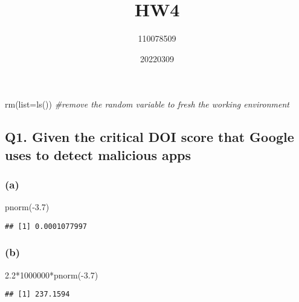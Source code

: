 \documentclass[
]{article}
\title{HW4}
\author{110078509}
\date{20220309}
\newenvironment{Shaded}{\begin{snugshade}}{\end{snugshade}}
\newcommand{\AttributeTok}[1]{\textcolor[rgb]{0.77,0.63,0.00}{#1}}
\newcommand{\CommentTok}[1]{\textcolor[rgb]{0.56,0.35,0.01}{\textit{#1}}}
\newcommand{\DecValTok}[1]{\textcolor[rgb]{0.00,0.00,0.81}{#1}}
\newcommand{\FloatTok}[1]{\textcolor[rgb]{0.00,0.00,0.81}{#1}}
\newcommand{\FunctionTok}[1]{\textcolor[rgb]{0.00,0.00,0.00}{#1}}
\newcommand{\NormalTok}[1]{#1}
\newcommand{\SpecialCharTok}[1]{\textcolor[rgb]{0.00,0.00,0.00}{#1}}
\begin{document}
\maketitle

\begin{Shaded}
\begin{Highlighting}[]
\FunctionTok{rm}\NormalTok{(}\AttributeTok{list=}\FunctionTok{ls}\NormalTok{()) }
\CommentTok{\#remove the random variable to fresh the working environment}
\end{Highlighting}
\end{Shaded}

\hypertarget{q1.-given-the-critical-doi-score-that-google-uses-to-detect-malicious-apps}{%
\subsection{Q1. Given the critical DOI score that Google uses to detect
malicious
apps}\label{q1.-given-the-critical-doi-score-that-google-uses-to-detect-malicious-apps}}

\hypertarget{a}{%
\subsubsection{(a)}\label{a}}

\begin{Shaded}
\begin{Highlighting}[]
\FunctionTok{pnorm}\NormalTok{(}\SpecialCharTok{{-}}\FloatTok{3.7}\NormalTok{)}
\end{Highlighting}
\end{Shaded}

\begin{verbatim}
## [1] 0.0001077997
\end{verbatim}

\hypertarget{b}{%
\subsubsection{(b)}\label{b}}

\begin{Shaded}
\begin{Highlighting}[]
\FloatTok{2.2}\SpecialCharTok{*}\DecValTok{1000000}\SpecialCharTok{*}\FunctionTok{pnorm}\NormalTok{(}\SpecialCharTok{{-}}\FloatTok{3.7}\NormalTok{)}
\end{Highlighting}
\end{Shaded}

\begin{verbatim}
## [1] 237.1594
\end{verbatim}
\end{document}
